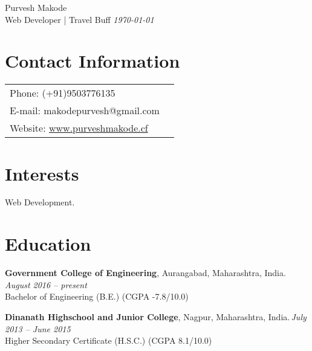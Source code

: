 \documentclass[margin,line]{res}
\begin{document}
{\Huge \ttfamily Purvesh Makode} \\
{\small Web Developer | Travel Buff} \hspace{11cm} {\em \today}
\vspace{0.03in}
\begin{resume}
\section{\sc Contact Information}



\vspace{.08in}

\begin{tabular} {@{}p{3in}p{1in}}
             {Phone:}  (+91)9503776135 \\
		{E-mail:}  makodepurvesh@gmail.com\\
		 {Website:} \url{www.purveshmakode.cf}
\end{tabular}


\section{\sc Interests}

Web Development.

\section{\sc Education}
{\bf Government College of Engineering}, Aurangabad, Maharashtra, India.\, \hfill  {\em August 2016 -- present} \\
Bachelor of Engineering (B.E.) \hfill(CGPA -7.8/10.0)

{\bf Dinanath Highschool and Junior College}, Nagpur, Maharashtra, India.\,\hfill {\em July 2013 -- June 2015}\\
Higher Secondary Certificate (H.S.C.) \hfill(CGPA 8.1/10.0)
 
\iffalse
\section{\sc Awards and Fellowships}
Award 1\\
Fellowship 1\\
\fi

\iffalse
\section{\sc Personal Achievements}
---------------------\\
---------------------
\fi

\end{resume}
\end{document}
